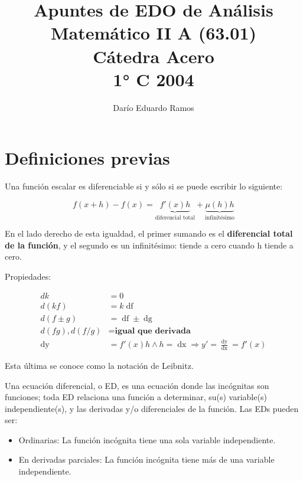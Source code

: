 \documentclass{article}
\title{Apuntes de EDO de Análisis Matemático II A (63.01) \\ Cátedra Acero \\ 1° C 2004}
\author{Darío Eduardo Ramos}
\begin{document}
\maketitle

\tableofcontents{}
\newpage

\section{Definiciones previas}

Una función escalar es diferenciable si y sólo si se puede escribir lo siguiente:

\begin{equation}
f(x+h) - f(x) = \underbrace{f'(x) h}_{\text{diferencial total}} + \underbrace{ \mu(h) h }_{\text{infinitésimo}}
\end{equation}

En el lado derecho de esta igualdad, el primer sumando es el \textbf{diferencial total de la función}, y el segundo es un infinitésimo: tiende a cero cuando h tiende a cero.

Propiedades:

\begin{subequations}
\begin{align}
d k & = 0 \\
d(k f) & = k \mathop{df} \\
d(f \pm g) & = \mathop{df} \pm \mathop{dg} \\
d(f g), d( f / g ) & = \textbf{igual que derivada} \\
\mathop{dy} & = f'(x) h \wedge h = \mathop{dx} \Longrightarrow y' = \frac{\mathop{dy}}{\mathop{dx}} = f'(x)
\end{align}
\end{subequations}

Esta última se conoce como la notación de Leibnitz.

Una ecuación diferencial, o ED, es una ecuación donde las incógnitas son funciones; toda ED relaciona una función a determinar, su(s) variable(s) independiente(s), y las derivadas y/o diferenciales de la función. Las EDs pueden ser:

\begin{itemize}
\item Ordinarias: La función incógnita tiene una sola variable independiente.
\item En derivadas parciales: La función incógnita tiene más de una variable independiente.
\end{itemize}
\end{document}
